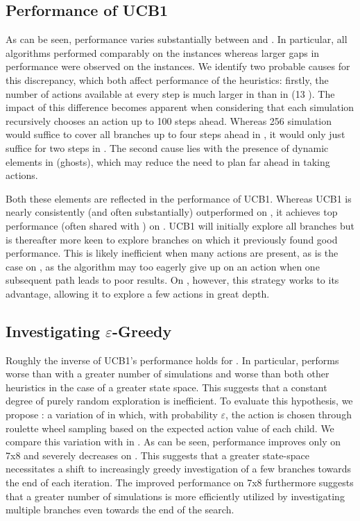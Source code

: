 \subsection{Performance of UCB1}
As can be seen, performance varies substantially between \rock and \poc. In particular, all algorithms performed comparably on the \poc instances whereas larger gaps in performance were observed on the \rock instances. We identify two probable causes for this discrepancy, which both affect performance of the heuristics: firstly, the number of actions available at every step is much larger in \rock than in \poc (13 ). The impact of this difference becomes apparent when considering that each simulation recursively chooses an action up to 100 steps ahead. Whereas 256 simulation would suffice to cover all branches up to four steps ahead in \poc, it would only just suffice for two steps in \rock. The second cause lies with the presence of dynamic elements in \poc (ghosts), which may reduce the need to plan far ahead in taking actions.

Both these elements are reflected in the performance of UCB1. Whereas UCB1 is nearly consistently (and often substantially) outperformed on \rock, it achieves top performance (often shared with \soft) on \poc. UCB1 will initially explore all branches but is thereafter more keen to explore branches on which it previously found good performance. This is likely inefficient when many actions are present, as is the case on \rock, as the algorithm may too eagerly give up on an action when one subsequent path leads to poor results. On \poc, however, this strategy works to its advantage, allowing it to explore a few actions in great depth. 


\subsection{Investigating $\varepsilon$-Greedy}
Roughly the inverse of UCB1's performance holds for \egreedy. In particular, \egreedy performs worse than \soft with a greater number of simulations and worse than both other heuristics in the case of a greater state space. This suggests that a constant degree of purely random exploration is inefficient. To evaluate this hypothesis, we propose \eroulette: a variation of \egreedy in which, with probability $\varepsilon$, the action is chosen through roulette wheel sampling based on the expected action value of each child. We compare this variation with \soft in . As can be seen, performance improves only on \rock 7x8 and severely decreases on \poc. This suggests that a greater state-space necessitates a shift to increasingly greedy investigation of a few branches towards the end of each iteration. The improved performance on \rock 7x8 furthermore suggests that a greater number of simulations is more efficiently utilized by investigating multiple branches even towards the end of the search.

